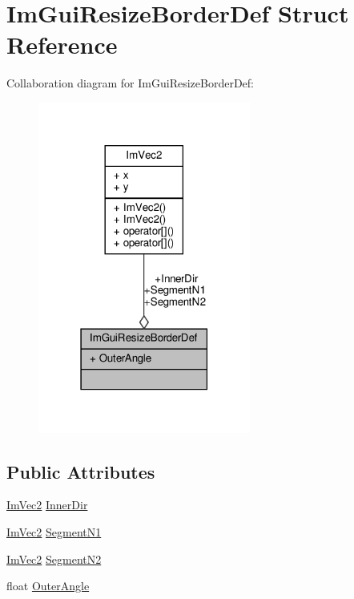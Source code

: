 \hypertarget{structImGuiResizeBorderDef}{}\section{Im\+Gui\+Resize\+Border\+Def Struct Reference}
\label{structImGuiResizeBorderDef}


Collaboration diagram for Im\+Gui\+Resize\+Border\+Def\+:
\nopagebreak
\begin{figure}[H]
\begin{center}
\leavevmode
\includegraphics[width=198pt]{structImGuiResizeBorderDef__coll__graph}
\end{center}
\end{figure}
\subsection*{Public Attributes}
\begin{DoxyCompactItemize}
\item 
\hyperlink{structImVec2}{Im\+Vec2} \hyperlink{structImGuiResizeBorderDef_ac7561a6f748779d0318a80e6c91cfc10}{Inner\+Dir}
\item 
\hyperlink{structImVec2}{Im\+Vec2} \hyperlink{structImGuiResizeBorderDef_a89ab538c595c476e055ba33dca3451b9}{Segment\+N1}
\item 
\hyperlink{structImVec2}{Im\+Vec2} \hyperlink{structImGuiResizeBorderDef_a8f025428a884a2167a504858a79650a2}{Segment\+N2}
\item 
float \hyperlink{structImGuiResizeBorderDef_a98a0fd1c91fa782c3c4d5093113b2fa9}{Outer\+Angle}
\end{DoxyCompactItemize}


